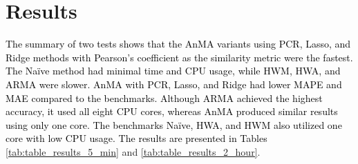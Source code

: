 \documentclass[journal, twoside]{IEEEtran}
\begin{document}
\section{Results}
\label{sec:Results}

\textcolor{black}{The summary of two tests shows that the \ac{AnMA} variants using \ac{PCR}, Lasso, and Ridge methods with Pearson's coefficient as the similarity metric were the fastest. The Naïve method had minimal time and CPU usage, while \ac{HWM}, \ac{HWA}, and \ac{ARMA} were slower. \ac{AnMA} with \ac{PCR}, Lasso, and Ridge had lower \ac{MAPE} and \ac{MAE} compared to the benchmarks. Although \ac{ARMA} achieved the highest accuracy, it used all eight CPU cores, whereas \ac{AnMA} produced similar results using only one core. The benchmarks Naïve, \ac{HWA}, and \ac{HWM} also utilized one core with low CPU usage. The results are presented in Tables} \ref{tab:table_results_5_min} and \ref{tab:table_results_2_hour}.
\end{document}

